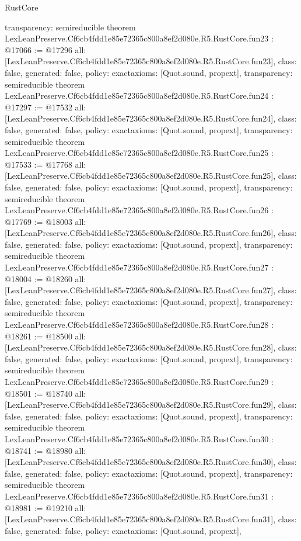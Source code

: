 \begin{lexlean}{RustCore}
\begin{coremodule}
{  transparency: semireducible
}
theorem LexLeanPreserve.Cf6cb4fdd1e85e72365c800a8ef2d080e.R5.RustCore.fun23 : @17066 := @17296 {
  all: [LexLeanPreserve.Cf6cb4fdd1e85e72365c800a8ef2d080e.R5.RustCore.fun23],
  class: false,
  generated: false,
  policy: exact{axioms: [Quot.sound, propext]},
  transparency: semireducible
}
theorem LexLeanPreserve.Cf6cb4fdd1e85e72365c800a8ef2d080e.R5.RustCore.fun24 : @17297 := @17532 {
  all: [LexLeanPreserve.Cf6cb4fdd1e85e72365c800a8ef2d080e.R5.RustCore.fun24],
  class: false,
  generated: false,
  policy: exact{axioms: [Quot.sound, propext]},
  transparency: semireducible
}
theorem LexLeanPreserve.Cf6cb4fdd1e85e72365c800a8ef2d080e.R5.RustCore.fun25 : @17533 := @17768 {
  all: [LexLeanPreserve.Cf6cb4fdd1e85e72365c800a8ef2d080e.R5.RustCore.fun25],
  class: false,
  generated: false,
  policy: exact{axioms: [Quot.sound, propext]},
  transparency: semireducible
}
theorem LexLeanPreserve.Cf6cb4fdd1e85e72365c800a8ef2d080e.R5.RustCore.fun26 : @17769 := @18003 {
  all: [LexLeanPreserve.Cf6cb4fdd1e85e72365c800a8ef2d080e.R5.RustCore.fun26],
  class: false,
  generated: false,
  policy: exact{axioms: [Quot.sound, propext]},
  transparency: semireducible
}
theorem LexLeanPreserve.Cf6cb4fdd1e85e72365c800a8ef2d080e.R5.RustCore.fun27 : @18004 := @18260 {
  all: [LexLeanPreserve.Cf6cb4fdd1e85e72365c800a8ef2d080e.R5.RustCore.fun27],
  class: false,
  generated: false,
  policy: exact{axioms: [Quot.sound, propext]},
  transparency: semireducible
}
theorem LexLeanPreserve.Cf6cb4fdd1e85e72365c800a8ef2d080e.R5.RustCore.fun28 : @18261 := @18500 {
  all: [LexLeanPreserve.Cf6cb4fdd1e85e72365c800a8ef2d080e.R5.RustCore.fun28],
  class: false,
  generated: false,
  policy: exact{axioms: [Quot.sound, propext]},
  transparency: semireducible
}
theorem LexLeanPreserve.Cf6cb4fdd1e85e72365c800a8ef2d080e.R5.RustCore.fun29 : @18501 := @18740 {
  all: [LexLeanPreserve.Cf6cb4fdd1e85e72365c800a8ef2d080e.R5.RustCore.fun29],
  class: false,
  generated: false,
  policy: exact{axioms: [Quot.sound, propext]},
  transparency: semireducible
}
theorem LexLeanPreserve.Cf6cb4fdd1e85e72365c800a8ef2d080e.R5.RustCore.fun30 : @18741 := @18980 {
  all: [LexLeanPreserve.Cf6cb4fdd1e85e72365c800a8ef2d080e.R5.RustCore.fun30],
  class: false,
  generated: false,
  policy: exact{axioms: [Quot.sound, propext]},
  transparency: semireducible
}
theorem LexLeanPreserve.Cf6cb4fdd1e85e72365c800a8ef2d080e.R5.RustCore.fun31 : @18981 := @19210 {
  all: [LexLeanPreserve.Cf6cb4fdd1e85e72365c800a8ef2d080e.R5.RustCore.fun31],
  class: false,
  generated: false,
  policy: exact{axioms: [Quot.sound, propext]},
}
\end{coremodule}
\end{lexlean}
